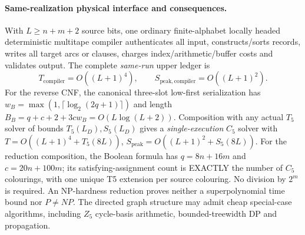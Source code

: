 \documentclass[11pt]{article}
\begin{document}
\paragraph{Same-realization physical interface and consequences.}
With $L\ge n+m+2$ source bits, one ordinary finite-alphabet
locally headed deterministic multitape compiler authenticates
all input, constructs/sorts records, writes all target arcs or
clauses, charges index/arithmetic/buffer costs and validates output.
The complete \emph{same-run} upper ledger is
\[
 T_{\mathrm{compiler}}=O((L+1)^4),\qquad
 S_{\mathrm{peak,compiler}}=O((L+1)^2).
\]
For the reverse CNF, the canonical three-slot low-first
serialization has $w_B=\max(1,\lceil\log_2(2q+1)\rceil)$ and
length $B_B=q+c+2+3cw_B=O(L\log(L+2))$.
Composition with any actual $T_5$ solver of bounds
$T_5(L_D),S_5(L_D)$ gives a \emph{single-execution}
$C_5$ solver with
$T=O((L+1)^4+T_5(8L))$,
$S_{\mathrm{peak}}=O((L+1)^2+S_5(8L))$.
For the reduction composition, the Boolean formula has
$q=8n+16m$ and $c=20n+100m$; its satisfying-assignment
count is EXACTLY the number of $C_5$ colourings, with one
unique T5 extension per source colouring. No division by $2^m$
is required.
An NP-hardness reduction proves neither a superpolynomial
time bound nor $P\ne NP$. The directed graph structure may
admit cheap special-case algorithms, including $Z_5$
cycle-basis arithmetic, bounded-treewidth DP and propagation.
\end{document}
